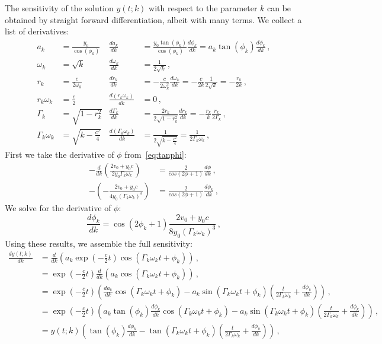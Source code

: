 \documentclass[utf8,english,DIV=12]{scrartcl}
\begin{document}
The sensitivity of the solution $y(t;k)$ with respect to the parameter $k$ can be
obtained by straight forward differentiation, albeit with many terms. We collect a list of derivatives:
\begin{align}
  a_k &= \frac{y_0}{\cos(\phi_k)} & \frac{da_k}{dk} &= \frac{y_0\tan(\phi_k)}{\cos(\phi_k)}\frac{d\phi_k}{dk}=a_k\tan(\phi_k)\frac{d\phi_k}{dk}\,,\\
  \omega_k&=\sqrt{k} & \frac{d\omega_k}{dk}&=\frac{1}{2\sqrt{k}}\,,\\
  r_k&=\frac{c}{2\omega_k} & \frac{dr_k}{dk}&=-\frac{c}{2\omega_k^2}\frac{d\omega_k}{dk}=-\frac{c}{2 k}\frac{1}{2\sqrt{k}}=-\frac{r_k}{2k}\,,\\
  r_k\omega_k&=\frac{c}{2} & \frac{d(r_k\omega_k )}{dk}&=0\,,\\
  \Gamma_k&=\sqrt{1-r_k^2} & \frac{d\Gamma_k}{dk}&=\frac{2 r_k}{2\sqrt{1-r_k^2}}\frac{dr_k}{dk}=-\frac{r_k}{k}\frac{r_k}{2\Gamma_k}\,,\\
  \Gamma_k\omega_k&=\sqrt{k-\frac{c^2}{4}} & \frac{d(\Gamma_k\omega_k)}{dk}&=\frac{1}{2\sqrt{k-\frac{c^2}{4}}}=\frac{1}{2\Gamma_k\omega_k}\,,
\end{align}
First we take the derivative of $\phi$ from~\eqref{eq:tanphi}:
\begin{align}
  -\frac{d}{dk}\left(\frac{2v_0 + y_0c}{2y_0\Gamma_k\omega_k}\right) &= \frac{2}{cos(2\phi+1)} \frac{d\phi}{dk}\,,\\
  -\left(-\frac{2v_0 + y_0c}{4y_0(\Gamma_k\omega_k)^3}\right) &= \frac{2}{cos(2\phi+1)} \frac{d\phi_k}{dk}\,,
\end{align}
We solve for the derivative of $\phi$:
\begin{equation}
  \frac{d\phi_k}{dk}=\cos(2\phi_k+1)\frac{2v_0 + y_0c}{8y_0(\Gamma_k\omega_k)^3}\,,
\end{equation}
Using these results, we assemble the full sensitivity:
\begin{equation}
  \label{eq:dydk}
  \begin{split}
    \frac{dy(t;k)}{dk}&=\frac{d}{dk}\left(a_k\exp\left(-\frac{c}{2}t\right)\cos(\Gamma_k\omega_k t+\phi_k)\right)\,,\\
    &=\exp\left(-\frac{c}{2}t\right)\frac{d}{dk}\left(a_k\cos(\Gamma_k\omega_k t+\phi_k)\right)\,,\\
    &=\exp\left(-\frac{c}{2}t\right)\left(\frac{da_k}{dk}\cos(\Gamma_k\omega_k t+\phi_k) - a_k \sin(\Gamma_k\omega_k t+\phi_k)\left(\frac{t}{2\Gamma_k\omega_k}+\frac{d\phi_k}{dk}\right)\right)\,,\\
    &=\exp\left(-\frac{c}{2}t\right)\left(a_k\tan(\phi_k)\frac{d\phi_k}{dk}\cos(\Gamma_k\omega_k t+\phi_k) - a_k \sin(\Gamma_k\omega_k t+\phi_k)\left(\frac{t}{2\Gamma_k\omega_k}+\frac{d\phi_k}{dk}\right)\right)\,,\\
    &=y(t;k)\left(\tan(\phi_k)\frac{d\phi_k}{dk} - \tan(\Gamma_k\omega_k t+\phi_k)\left(\frac{t}{2\Gamma_k\omega_k}+\frac{d\phi_k}{dk}\right)\right)\,,
  \end{split}
\end{equation}
\end{document}
